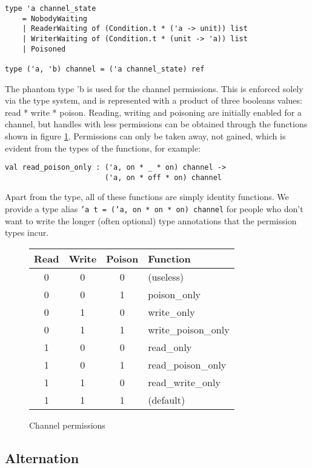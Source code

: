 \documentclass[a4paper,12pt]{article}
\begin{document}
\begin{verbatim}
type 'a channel_state
    = NobodyWaiting 
    | ReaderWaiting of (Condition.t * ('a -> unit)) list
    | WriterWaiting of (Condition.t * (unit -> 'a)) list
    | Poisoned

type ('a, 'b) channel = ('a channel_state) ref
\end{verbatim}

The phantom type 'b is used for the channel permissions. This is enforced solely via the type
system, and is represented with a product of three booleans values: read * write * poison.
Reading, writing and poisoning are initially enabled for a channel, but handles with less 
permissions can be obtained through the functions shown in figure \ref{channel-permissions}. 
Permissions can only be taken away, not gained, which is evident from the types of the 
functions, for example: 

\begin{verbatim}
val read_poison_only : ('a, on * _ * on) channel -> 
                       ('a, on * off * on) channel
\end{verbatim}

Apart from the type, all of these functions are simply identity functions. We provide a
type alias \texttt{'a t = ('a, on * on * on) channel} for people who don't want to write the
longer (often optional) type annotations that the permission types incur.

\begin{figure}[h]
\centering
\begin{tabular}{c|c|c|l}
Read & Write & Poison & Function \\
\hline
0 & 0 & 0 & (useless) \\
0 & 0 & 1 & poison\_only \\
0 & 1 & 0 & write\_only \\
0 & 1 & 1 & write\_poison\_only \\
1 & 0 & 0 & read\_only \\
1 & 0 & 1 & read\_poison\_only \\
1 & 1 & 0 & read\_write\_only \\
1 & 1 & 1 & (default) \\
\end{tabular}
\caption{Channel permissions}
\label{channel-permissions}
\end{figure}

\subsection{Alternation}
\end{document}
